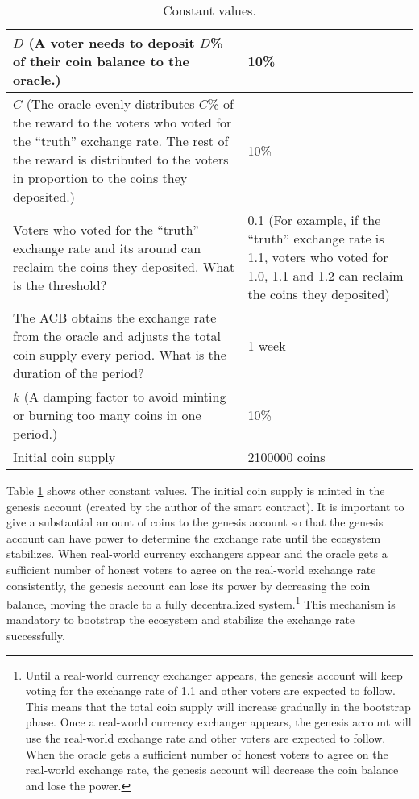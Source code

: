 \documentclass[dvipdfmx,a4paper]{article}
\begin{document}
\begin{table}[htb]
\begin{center}
\caption{Constant values.}\vspace{2ex}
\begin{tabular}{p{26em}|p{10em}}\hline
$D$ (A voter needs to deposit $D$\% of their coin balance to the oracle.) & 10\%\\\hline
$C$ (The oracle evenly distributes $C$\% of the reward to the voters who voted for the ``truth'' exchange rate. The rest of the reward is distributed to the voters in proportion to the coins they deposited.) & 10\%\\\hline
Voters who voted for the ``truth'' exchange rate and its around can reclaim the coins they deposited. What is the threshold? & 0.1 (For example, if the ``truth'' exchange rate is 1.1, voters who voted for 1.0, 1.1 and 1.2 can reclaim the coins they deposited)\\\hline
The ACB obtains the exchange rate from the oracle and adjusts the total coin supply every period. What is the duration of the period? & 1 week\\\hline
$k$ (A damping factor to avoid minting or burning too many coins in one period.) & 10\%\\\hline
Initial coin supply & 2100000 coins\\\hline
\end{tabular}
\label{table2}
\end{center}
\end{table}

Table \ref{table2} shows other constant values. The initial coin supply is minted in the genesis account (created by the author of the smart contract). It is important to give a substantial amount of coins to the genesis account so that the genesis account can have power to determine the exchange rate until the ecosystem stabilizes. When real-world currency exchangers appear and the oracle gets a sufficient number of honest voters to agree on the real-world exchange rate consistently, the genesis account can lose its power by decreasing the coin balance, moving the oracle to a fully decentralized system.\footnote{Until a real-world currency exchanger appears, the genesis account will keep voting for the exchange rate of 1.1 and other voters are expected to follow. This means that the total coin supply will increase gradually in the bootstrap phase. Once a real-world currency exchanger appears, the genesis account will use the real-world exchange rate and other voters are expected to follow. When the oracle gets a sufficient number of honest voters to agree on the real-world exchange rate, the genesis account will decrease the coin balance and lose the power.} This mechanism is mandatory to bootstrap the ecosystem and stabilize the exchange rate successfully.
\end{document}
